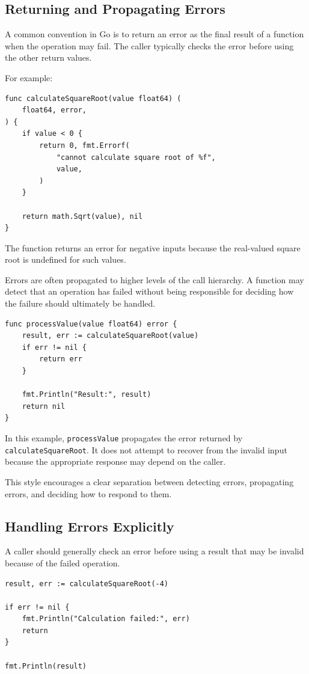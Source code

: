 \subsection{Returning and Propagating Errors}

A common convention in Go is to return an error as the final result of a function when the operation may fail. The caller typically checks the error before using the other return values.

For example:

\begin{lstlisting}
func calculateSquareRoot(value float64) (
    float64, error,
) {
    if value < 0 {
        return 0, fmt.Errorf(
            "cannot calculate square root of %f",
            value,
        )
    }

    return math.Sqrt(value), nil
}
\end{lstlisting}

The function returns an error for negative inputs because the real-valued square root is undefined for such values.

Errors are often propagated to higher levels of the call hierarchy. A function may detect that an operation has failed without being responsible for deciding how the failure should ultimately be handled.

\begin{lstlisting}
func processValue(value float64) error {
    result, err := calculateSquareRoot(value)
    if err != nil {
        return err
    }

    fmt.Println("Result:", result)
    return nil
}
\end{lstlisting}

In this example, \texttt{processValue} propagates the error returned by \texttt{calculateSquareRoot}. It does not attempt to recover from the invalid input because the appropriate response may depend on the caller.

This style encourages a clear separation between detecting errors, propagating errors, and deciding how to respond to them.

\subsection{Handling Errors Explicitly}

A caller should generally check an error before using a result that may be invalid because of the failed operation.

\begin{lstlisting}
result, err := calculateSquareRoot(-4)

if err != nil {
    fmt.Println("Calculation failed:", err)
    return
}

fmt.Println(result)
\end{lstlisting}

